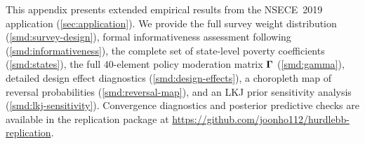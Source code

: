 
This appendix presents extended empirical results from the NSECE~2019
application (\cref{sec:application}).  We provide the full survey weight
distribution (\cref{smd:survey-design}), formal informativeness
assessment following~\citet{Pfeffermann1993}
(\cref{smd:informativeness}), the complete set of state-level poverty
coefficients (\cref{smd:states}), the full $40$-element policy
moderation matrix $\boldsymbol{\Gamma}$ (\cref{smd:gamma}), detailed design
effect diagnostics (\cref{smd:design-effects}), a choropleth map of
reversal probabilities (\cref{smd:reversal-map}), and an LKJ prior
sensitivity analysis (\cref{smd:lkj-sensitivity}).  Convergence diagnostics
and posterior predictive checks are available in the replication package
at \url{https://github.com/joonho112/hurdlebb-replication}.














